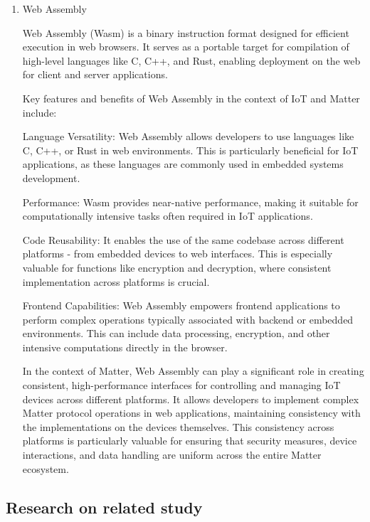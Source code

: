 \documentclass[conference]{IEEEtran}
\begin{document}
\begin{enumerate}[itemsep=2ex, parsep=1ex]
	\item Web Assembly
	      	      	      
	      Web Assembly (Wasm) is a binary instruction format designed for efficient execution in web browsers. It serves as a portable target for compilation of high-level languages like C, C++, and Rust, enabling deployment on the web for client and server applications.
	      	      	      
	      Key features and benefits of Web Assembly in the context of IoT and Matter include:
	      	      	          
	      Language Versatility: Web Assembly allows developers to use languages like C, C++, or Rust in web environments. This is particularly beneficial for IoT applications, as these languages are commonly used in embedded systems development.
	      	      	          
	      Performance: Wasm provides near-native performance, making it suitable for computationally intensive tasks often required in IoT applications.
	      	      	          
	      Code Reusability: It enables the use of the same codebase across different platforms - from embedded devices to web interfaces. This is especially valuable for functions like encryption and decryption, where consistent implementation across platforms is crucial.
	      	      	          
	      Frontend Capabilities: Web Assembly empowers frontend applications to perform complex operations typically associated with backend or embedded environments. This can include data processing, encryption, and other intensive computations directly in the browser.
	      	      	          
	      In the context of Matter, Web Assembly can play a significant role in creating consistent, high-performance interfaces for controlling and managing IoT devices across different platforms. It allows developers to implement complex Matter protocol operations in web applications, maintaining consistency with the implementations on the devices themselves. This consistency across platforms is particularly valuable for ensuring that security measures, device interactions, and data handling are uniform across the entire Matter ecosystem.
	      	      	          
\end{enumerate}

\subsection{Research on related study}
\end{document}
